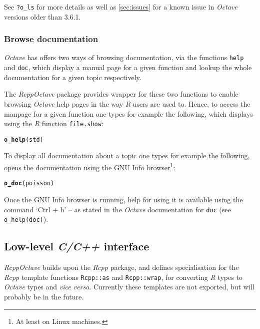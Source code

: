 \documentclass[english,10pt,a4paper]{article}\usepackage[]{graphicx}\usepackage[]{color}
\makeatletter
\newcommand{\hlstd}[1]{\textcolor[rgb]{0.345,0.345,0.345}{#1}}%
\newcommand{\hlkwd}[1]{\textcolor[rgb]{0.737,0.353,0.396}{\textbf{#1}}}%
\newenvironment{kframe}{%
 \def\at@end@of@kframe{}%
 \ifinner\ifhmode%
  \def\at@end@of@kframe{\end{minipage}}%
  \begin{minipage}{\columnwidth}%
 \fi\fi%
 \def\FrameCommand##1{\hskip\@totalleftmargin \hskip-\fboxsep
 \colorbox{shadecolor}{##1}\hskip-\fboxsep
     \hskip-\linewidth \hskip-\@totalleftmargin \hskip\columnwidth}%
 \MakeFramed {\advance\hsize-\width
   \@totalleftmargin\z@ \linewidth\hsize
   \@setminipage}}%
 {\par\unskip\endMakeFramed%
 \at@end@of@kframe}
\newenvironment{knitrout}{}{} %
\let\proglang=\textit
\let\code=\texttt
\newcommand{\pkgname}[1]{\textit{#1}\xspace}
\newcommand{\Rpkg}[1]{\pkgname{#1} package\xspace}
\newcommand{\R}{\proglang{R}\xspace}
\newcommand{\octave}{\proglang{Octave}\xspace}
\makeatother
\begin{document}
See \code{?o\_ls} for more details as well as \cref{sec:issues} for a
known issue in \octave versions older than 3.6.1.

\subsubsection{Browse documentation}

\octave has offers two ways of browsing documentation, via the functions
\code{help} and \code{doc}, which display a manual page for a given function and
lookup the whole documentation for a given topic respectively.

The \Rpkg{RcppOctave} provides wrapper for these two functions to enable
browsing \octave help pages in the way \R users are used to.
Hence, to access the manpage for a given function one types for example the
following, which displays using the \R function \code{file.show}:
\begin{knitrout}
\color{fgcolor}\begin{kframe}
\begin{alltt}
\hlkwd{o_help}\hlstd{(std)}
\end{alltt}
\end{kframe}
\end{knitrout}


To display all documentation about a topic one types for example the following,
opens the documentation using the GNU Info browser\footnote{At least on
Linux machines.}:
\begin{knitrout}
\color{fgcolor}\begin{kframe}
\begin{alltt}
\hlkwd{o_doc}\hlstd{(poisson)}
\end{alltt}
\end{kframe}
\end{knitrout}

Once the GNU Info browser is running, help for using it is available using the
command `Ctrl + h' -- as stated in the \octave documentation for \code{doc} (see
\code{o\_help(doc)}).

\subsection{Low-level \textit{C/C++} interface}

\pkgname{RcppOctave} builds upon the \Rpkg{Rcpp}, and defines specialisation
for the \proglang{Rcpp} template functions \code{Rcpp::as} and
\code{Rcpp::wrap}, for converting \proglang{R} types to \octave
types and \emph{vice versa}.
Currently these templates are not exported, but will probably be in the future.
\end{document}
